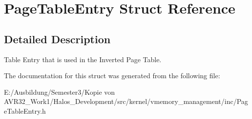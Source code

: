 \hypertarget{struct_page_table_entry}{
\section{PageTableEntry Struct Reference}
\label{struct_page_table_entry}
}


\subsection{Detailed Description}
Table Entry that is used in the Inverted Page Table. 

The documentation for this struct was generated from the following file:\begin{CompactItemize}
\item 
E:/Ausbildung/Semester3/Kopie von AVR32\_\-Work1/Halos\_\-Development/src/kernel/vmemory\_\-management/inc/PageTableEntry.h\end{CompactItemize}
